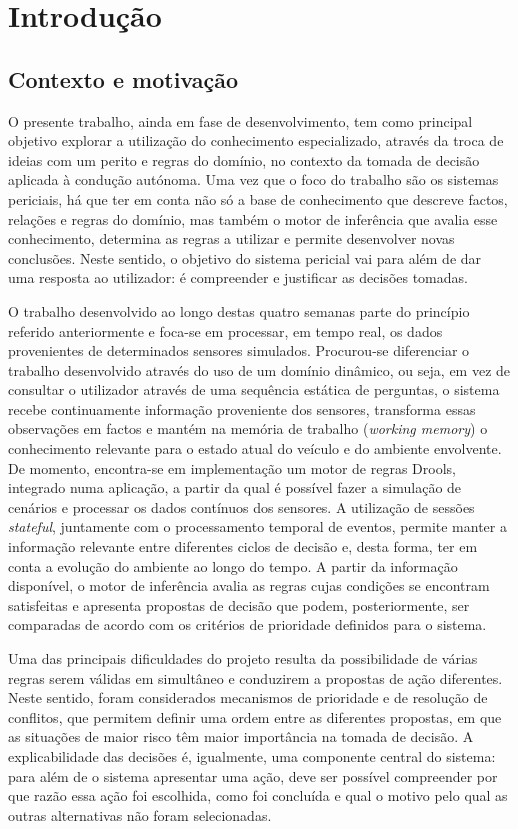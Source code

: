 \chapter{Introdução}
\label{cap:introducao}

\section{Contexto e motivação}
\label{sec:contexto}

O presente trabalho, ainda em fase de desenvolvimento, tem como principal
objetivo explorar a utilização do conhecimento especializado, através da
troca de ideias com um perito e regras do domínio, no contexto da tomada de
decisão aplicada à condução autónoma. Uma vez que o foco do trabalho são os
sistemas periciais, há que ter em conta não só a base de conhecimento que
descreve factos, relações e regras do domínio, mas também o motor de
inferência que avalia esse conhecimento, determina as regras a utilizar e
permite desenvolver novas conclusões. Neste
sentido, o objetivo do sistema pericial vai para além de dar uma resposta ao
utilizador: é compreender e justificar as decisões tomadas.

O trabalho desenvolvido ao longo destas quatro semanas parte do princípio
referido anteriormente e foca-se em processar, em tempo real, os dados
provenientes de determinados sensores simulados. Procurou-se diferenciar o
trabalho desenvolvido através do uso de um domínio dinâmico, ou seja, em vez
de consultar o utilizador através de uma sequência estática de perguntas, o
sistema recebe continuamente informação proveniente dos sensores, transforma
essas observações em factos e mantém na memória de trabalho (\emph{working memory}) o conhecimento
relevante para o estado atual do veículo e do ambiente envolvente. De
momento, encontra-se em implementação um motor de regras Drools, integrado
numa aplicação, a partir da qual é possível fazer a simulação de cenários e
processar os dados contínuos dos sensores. A utilização de sessões
\emph{stateful}, juntamente com o processamento temporal de eventos, permite
manter a informação relevante entre diferentes ciclos de decisão e, desta
forma, ter em conta a evolução do ambiente ao longo do tempo. A partir da
informação disponível, o motor de inferência avalia as regras cujas condições
se encontram satisfeitas e apresenta propostas de decisão que podem,
posteriormente, ser comparadas de acordo com os critérios de prioridade
definidos para o sistema.

Uma das principais dificuldades do projeto resulta da possibilidade de várias
regras serem válidas em simultâneo e conduzirem a propostas de ação
diferentes. Neste sentido, foram considerados mecanismos de prioridade e de
resolução de conflitos, que permitem definir uma ordem entre as diferentes
propostas, em que as situações de maior risco têm maior importância na
tomada de decisão. A explicabilidade das decisões é, igualmente, uma
componente central do sistema: para além de o sistema apresentar uma ação,
deve ser possível compreender por que razão essa ação foi escolhida, como foi
concluída e qual o motivo pelo qual as outras alternativas não foram
selecionadas.

